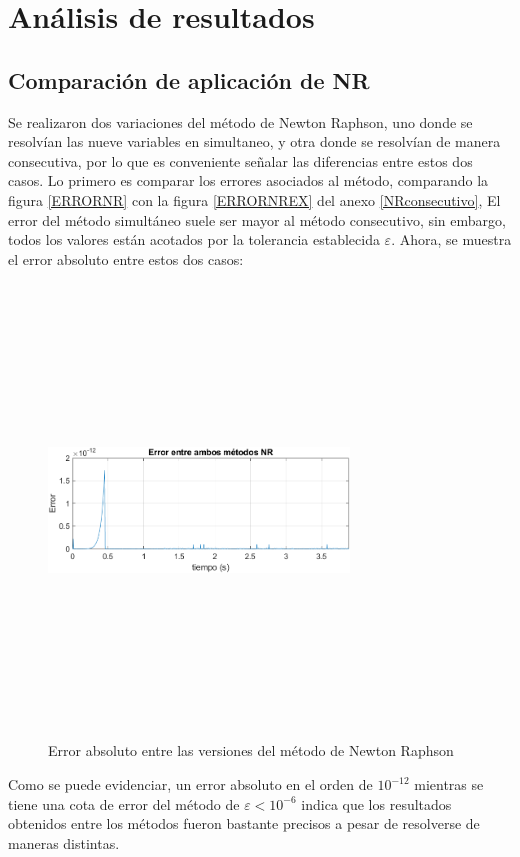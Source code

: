 \documentclass[12pt]{article}
\begin{document}
\section{Análisis de resultados}
\subsection{Comparación de aplicación de NR}
Se realizaron dos variaciones del método de Newton Raphson, uno donde se resolvían las nueve variables en simultaneo, y otra donde se resolvían de manera consecutiva, por lo que es conveniente señalar las diferencias entre estos dos casos. Lo primero es comparar los errores asociados al método, comparando la figura \ref{ERRORNR} con la figura \ref{ERRORNREX} del anexo \ref{NRconsecutivo}, El error del método simultáneo suele ser mayor al método consecutivo, sin embargo, todos los valores están acotados por la tolerancia establecida $\varepsilon$. Ahora, se muestra el error absoluto entre estos dos casos:
\begin{figure} [H]
    \centerline{\includegraphics[width=8cm, height=12cm,keepaspectratio]{Implementacion/Error entre NR.png}}
    \caption{Error absoluto entre las versiones del método de Newton Raphson}
    \label{}
\end{figure}
Como se puede evidenciar, un error absoluto en el orden de $10^{-12}$ mientras se tiene una cota de error del método de $\varepsilon<10^{-6}$ indica que los resultados obtenidos entre los métodos fueron bastante precisos a pesar de resolverse de maneras distintas.
\end{document}
